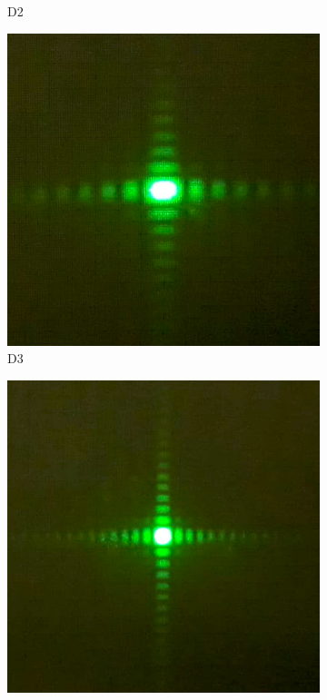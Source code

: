 \begin{figure}[H]
\begin{subfigure}[t]{.3\textwidth}
        \caption{D2}
        \label{fig:D2}
    \end{subfigure}
    \qquad
    \begin{subfigure}[t]{.3\textwidth}
        \centering
        \includegraphics[width=\textwidth]{figuras/medidas/D3.jpg}
        \caption{D3}
        \label{fig:D3}
    \end{subfigure}
    \qquad
    \begin{subfigure}[t]{.3\textwidth}
        \centering
        \includegraphics[width=\textwidth]{figuras/medidas/D4.jpg}

\end{subfigure}
\end{figure}
